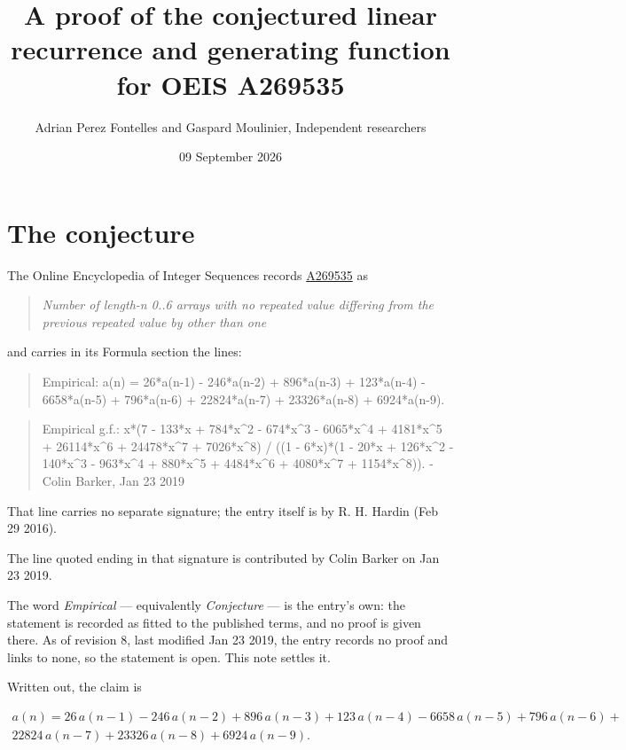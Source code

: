 \documentclass[11pt]{article}
\title{A proof of the conjectured linear recurrence and generating function for OEIS A269535}
\author{Adrian Perez Fontelles and Gaspard Moulinier, Independent researchers}
\date{09 September 2026}
\theoremstyle{definition}
\begin{document}
\maketitle
\section{The conjecture}

The Online Encyclopedia of Integer Sequences records \href{https://oeis.org/A269535}{A269535} as

\begin{quote}\itshape Number of length-n 0..6 arrays with no repeated value differing from the previous repeated value by other than one\end{quote}

and carries in its Formula section the lines:

\begin{quote}\ttfamily Empirical: a(n) = 26*a(n-1) - 246*a(n-2) + 896*a(n-3) + 123*a(n-4) - 6658*a(n-5) + 796*a(n-6) + 22824*a(n-7) + 23326*a(n-8) + 6924*a(n-9).\end{quote}

\begin{quote}\ttfamily Empirical g.f.: x*(7 - 133*x + 784*x\textasciicircum{}2 - 674*x\textasciicircum{}3 - 6065*x\textasciicircum{}4 + 4181*x\textasciicircum{}5 + 26114*x\textasciicircum{}6 + 24478*x\textasciicircum{}7 + 7026*x\textasciicircum{}8) / ((1 - 6*x)*(1 - 20*x + 126*x\textasciicircum{}2 - 140*x\textasciicircum{}3 - 963*x\textasciicircum{}4 + 880*x\textasciicircum{}5 + 4484*x\textasciicircum{}6 + 4080*x\textasciicircum{}7 + 1154*x\textasciicircum{}8)). - Colin Barker, Jan 23 2019\end{quote}

That line carries no separate signature; the entry itself is by R. H. Hardin (Feb 29 2016).

The line quoted ending in that signature is contributed by Colin Barker on Jan 23 2019.

The word {\itshape Empirical} --- equivalently {\itshape Conjecture} --- is the entry's own: the statement is recorded as fitted to the published terms, and no proof is given there. As of revision 8, last modified Jan 23 2019, the entry records no proof and links to none, so the statement is open. This note settles it.

Written out, the claim is

\begin{multline*} a(n) = 26\,a(n-1) - 246\,a(n-2) + 896\,a(n-3) + 123\,a(n-4) - 6658\,a(n-5) + 796\,a(n-6) + \\ 22824\,a(n-7) + 23326\,a(n-8) + 6924\,a(n-9). \end{multline*}
\end{document}
